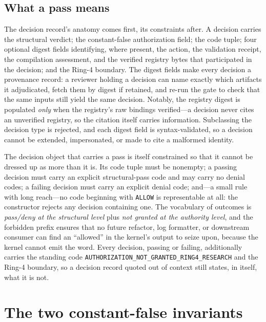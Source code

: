 \subsection{What a pass means}\label{ch09:pass-meaning}

The decision record's anatomy comes first, its constraints after. A decision carries the structural verdict; the constant-false authorization field; the code tuple; four optional digest fields identifying, where present, the action, the validation receipt, the compilation assessment, and the verified registry bytes that participated in the decision; and the Ring-4 boundary. The digest fields make every decision a provenance record: a reviewer holding a decision can name exactly which artifacts it adjudicated, fetch them by digest if retained, and re-run the gate to check that the same inputs still yield the same decision. Notably, the registry digest is populated \emph{only} when the registry's raw bindings verified---a decision never cites an unverified registry, so the citation itself carries information. Subclassing the decision type is rejected, and each digest field is syntax-validated, so a decision cannot be extended, impersonated, or made to cite a malformed identity.

The decision object that carries a pass is itself constrained so that it cannot be dressed up as more than it is. Its code tuple must be nonempty; a passing decision must carry an explicit structural-pass code and may carry no denial codes; a failing decision must carry an explicit denial code; and---a small rule with long reach---no code beginning with \texttt{ALLOW} is representable at all: the constructor rejects any decision containing one. The vocabulary of outcomes is \emph{pass/deny at the structural level} plus \emph{not granted at the authority level}, and the forbidden prefix ensures that no future refactor, log formatter, or downstream consumer can find an ``allowed'' in the kernel's output to seize upon, because the kernel cannot emit the word. Every decision, passing or failing, additionally carries the standing code \texttt{AUTHORIZATION\_NOT\_GRANTED\_RING4\_RESEARCH} and the Ring-4 boundary, so a decision record quoted out of context still states, in itself, what it is not.

\section{The two constant-false invariants}\label{ch09:constant-false}

